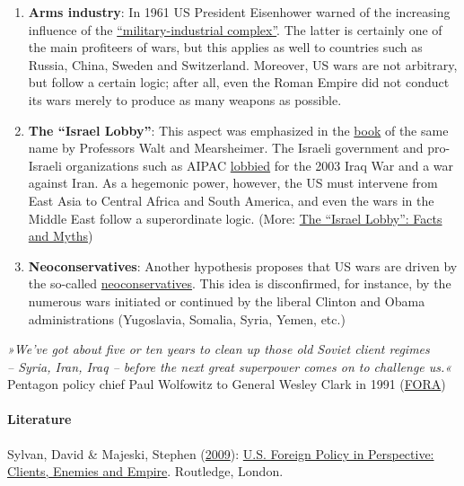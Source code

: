 \begin{enumerate}
\item
  \textbf{Arms industry}: In 1961 US President Eisenhower warned of the
  increasing influence of the
  \href{https://en.wikipedia.org/wiki/Military\%E2\%80\%93industrial_complex}{``military-industrial
  complex''}. The latter is certainly one of the main profiteers of
  wars, but this applies as well to countries such as Russia, China,
  Sweden and Switzerland. Moreover, US wars are not arbitrary, but
  follow a certain logic; after all, even the Roman Empire did not
  conduct its wars merely to produce as many weapons as possible.
\item
  \textbf{The ``Israel Lobby''}: This aspect was emphasized in the
  \href{https://en.wikipedia.org/wiki/The_Israel_Lobby_and_U.S._Foreign_Policy}{book}
  of the same name by Professors Walt and Mearsheimer. The Israeli
  government and pro-Israeli organizations such as AIPAC
  \href{https://fpif.org/dont_blame_the_iraq_debacle_on_the_israel_lobby/}{lobbied}
  for the 2003 Iraq War and a war against Iran. As a hegemonic power,
  however, the US must intervene from East Asia to Central Africa and
  South America, and even the wars in the Middle East follow a
  superordinate logic. (More:
  \href{https://swprs.org/the-israel-lobby-facts-and-myths/}{The
  ``Israel Lobby'': Facts and Myths})
\item
  \textbf{Neoconservatives}: Another hypothesis proposes that US wars
  are driven by the so-called
  \href{https://en.wikipedia.org/wiki/Neoconservatism}{neo­con­ser­vatives}.
  This idea is disconfirmed, for instance, by the numerous wars
  initiated or continued by the liberal Clinton and Obama
  administrations (Yugoslavia, Somalia, Syria, Yemen, etc.)
\end{enumerate}

\emph{»We've got about five or ten years to clean up those old Soviet
client regimes\\
-- Syria, Iran, Iraq -- before the next great superpower comes on to
challenge us.«}\\
Pentagon policy chief Paul Wolfowitz to General Wesley Clark in 1991
(\href{https://youtu.be/TY2DKzastu8?t=3m6s}{FORA})

\hypertarget{literature}{%
\paragraph{Literature}\label{literature}}

Sylvan, David \& Majeski, Stephen
(\href{http://www.us-foreign-policy-perspective.org/}{2009}):
\href{http://www.us-foreign-policy-perspective.org/}{U.S. Foreign Policy
in Perspective: Clients, Enemies and Empire}. Routledge, London.

